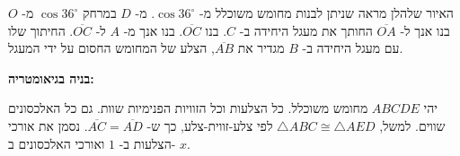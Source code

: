 האיור שלהלן מראה שניתן לבנות מחומש משוכלל מ-%
$\cos 36^\circ$.
מ-%
$D$
במרחק
$\cos 36^\circ$
מ-%
$O$
בנו אנך ל-%
$\overline{OA}$
החותך את מעגל היחידה ב-%
$C$.
בנו
$\overline{OC}$.
בנו אנך מ-%
$A$
ל-%
$\overline{OC}$.
החיתוך שלו עם מעגל היחידה ב-%
$B$
מגדיר את
$\overline{AB}$,
הצלע של המחומש החסום על ידי המעגל.

%




\textbf{בניה בגיאומטריה:}

יהי
$ABCDE$
מחומש משוכלל. כל הצלעות וכל הזוויות הפנימיות שוות. גם כל האלכסונים שווים. למשל,
$\triangle ABC\cong \triangle AED$
לפי צלע-זווית-צלע, כך ש-%
$\overline{AC}=\overline{AD}$.
נסמן את אורכי הצלעות ב-%
$1$
ואורכי האלכסונים ב-%
$x$.

